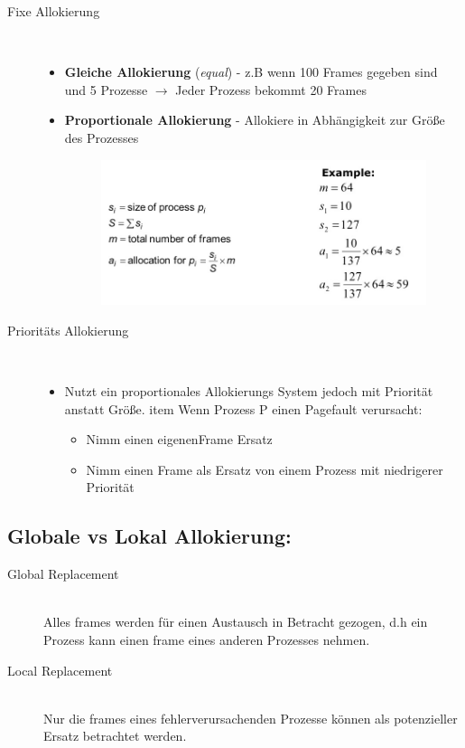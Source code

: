 \documentclass[a4paper]{scrreprt}
\begin{document}
\begin{description}

\item[Fixe Allokierung] \ \\

\begin{itemize}
\item \textbf{Gleiche Allokierung} (\textit{equal}) - z.B wenn 100 Frames gegeben sind und 5 Prozesse $\rightarrow$ Jeder Prozess bekommt 20 Frames
\item \textbf{Proportionale Allokierung} - Allokiere in Abhängigkeit zur Größe des Prozesses
\begin{figure}[ht]
\centering
\includegraphics[scale=0.5]{graphics/proportionalallocation.png}

\end{figure}

\end{itemize}

\item[Prioritäts Allokierung]\ \\
\begin{itemize}
\item Nutzt ein proportionales Allokierungs System jedoch mit Priorität anstatt Größe.
item Wenn Prozess P einen Pagefault verursacht:
\begin{itemize}
\item Nimm einen eigenenFrame Ersatz
\item Nimm einen Frame als Ersatz von einem Prozess mit niedrigerer Priorität 
\end{itemize}
\end{itemize}
\end{description}

\subsection{Globale vs Lokal Allokierung:}
\begin{description}
\item[Global Replacement] \ \\
Alles frames werden für einen Austausch in Betracht gezogen, d.h ein Prozess kann einen frame eines anderen Prozesses nehmen.
\item[Local Replacement]\ \\
Nur die frames eines fehlerverursachenden Prozesse können als potenzieller Ersatz betrachtet werden.
\end{description}
\end{document}
